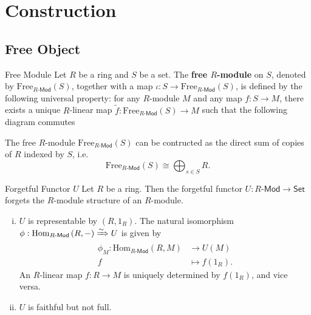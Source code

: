 \section{Construction}
\subsection{Free Object}
\begin{definition}{Free Module}{}
    Let $R$ be a ring and $S$ be a set. The \textbf{free $R$-module } on $S$, denoted by $\mathrm{Free}_{R\text{-}\mathsf{Mod}}(S)$, together with a map $\iota:S\to \mathrm{Free}_{R\text{-}\mathsf{Mod}}(S)$, is defined by the following universal property: for any $R$-module $M$ and any map $f:S\to M$, there exists a unique $R$-linear map $\widetilde{f}:\mathrm{Free}_{R\text{-}\mathsf{Mod}}(S)\to M$ such that the following diagram commutes
    \begin{center}
    \end{center}
    The free $R$-module $\mathrm{Free}_{R\text{-}\mathsf{Mod}}(S)$ can be contructed as the direct sum of copies of $R$ indexed by $S$, i.e. 
    \[
        \mathrm{Free}_{R\text{-}\mathsf{Mod}}(S)\cong \bigoplus_{s\in S}R.
    \]
\end{definition}


\begin{example}{Forgetful Functor $U$}{}
    Let $R$ be a ring. Then the forgetful functor $U:R\text{-}\mathsf{Mod}\to \mathsf{Set}$ forgets the $R$-module structure of an $R$-module. 
    \begin{enumerate}[(i)]
        \item $U$ is representable by $\left(R, 1_R\right)$. The natural isomorphism $\phi:\mathrm{Hom}_{R\text{-}\mathsf{Mod}}\left(R, -\right)\xRightarrow{\sim} U$ is given by 
        \begin{align*}
            \phi_M:\mathrm{Hom}_{R\text{-}\mathsf{Mod}}\left(R, M\right)&\longrightarrow U(M)\\
            f&\longmapsto f(1_R).
        \end{align*}
        An $R$-linear map $f:R\to M$ is uniquely determined by $f(1_R)$, and vice versa.
        \item $U$ is faithful but not full.
    \end{enumerate}
\end{example}
 

